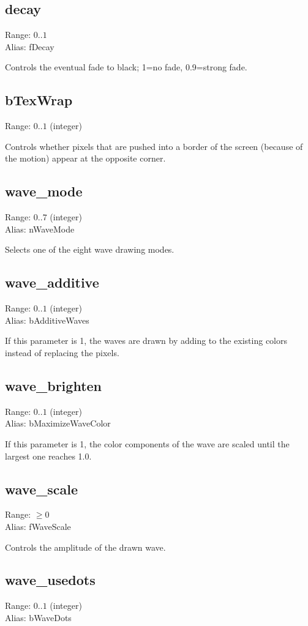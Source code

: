 \documentclass[11pt, a5paper, pagesize]{scrbook}
\begin{document}
\subsection{decay}
Range: $0..1$\\
Alias: fDecay

Controls the eventual fade to black; 1=no fade, 0.9=strong fade.

\subsection{bTexWrap}
Range: $0..1$ (integer)

Controls whether pixels that are pushed into a border of the screen (because of the motion) appear at the opposite corner.

\subsection{wave\_mode}
Range: $0..7$ (integer)\\
Alias: nWaveMode

Selects one of the eight wave drawing modes.

\subsection{wave\_additive}
Range: $0..1$ (integer)\\
Alias: bAdditiveWaves

If this parameter is 1, the waves are drawn by adding to the existing colors instead of replacing the pixels.

\subsection{wave\_brighten}
Range: $0..1$ (integer)\\
Alias: bMaximizeWaveColor

If this parameter is 1, the color components of the wave are scaled until the largest one reaches 1.0.

\subsection{wave\_scale}
Range: $\geq 0$\\
Alias: fWaveScale

Controls the amplitude of the drawn wave.

\subsection{wave\_usedots}
Range: $0..1$ (integer)\\
Alias: bWaveDots
\end{document}
